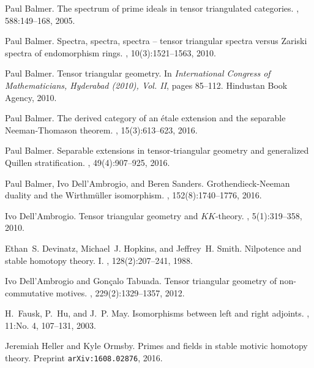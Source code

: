 \documentclass{amsart}
\numberwithin{equation}{section}
\theoremstyle{remark}
\begin{document}
\begin{thebibliography}{FHM03}

Paul Balmer.
\newblock The spectrum of prime ideals in tensor triangulated categories.
, 588:149--168, 2005.

Paul Balmer.
\newblock Spectra, spectra, spectra -- tensor triangular spectra versus
  {Z}ariski spectra of endomorphism rings.
, 10(3):1521--1563, 2010.

Paul Balmer.
\newblock Tensor triangular geometry.
\newblock In {\em International {C}ongress of {M}athematicians, Hyderabad
  (2010), {V}ol. {II}}, pages 85--112. Hindustan Book Agency, 2010.

Paul Balmer.
\newblock The derived category of an \'etale extension and the separable
  {N}eeman-{T}homason theorem.
, 15(3):613--623, 2016.

Paul Balmer.
\newblock Separable extensions in tensor-triangular geometry and generalized
  {Q}uillen stratification.
, 49(4):907--925, 2016.

Paul Balmer, Ivo Dell'Ambrogio, and Beren Sanders.
\newblock Grothendieck-{N}eeman duality and the {W}irthm\"uller isomorphism.
, 152(8):1740--1776, 2016.

Ivo Dell'Ambrogio.
\newblock Tensor triangular geometry and {$KK$}-theory.
, 5(1):319--358, 2010.

Ethan~S. Devinatz, Michael~J. Hopkins, and Jeffrey~H. Smith.
\newblock Nilpotence and stable homotopy theory. {I}.
, 128(2):207--241, 1988.

Ivo Dell'Ambrogio and Gon{\c{c}}alo Tabuada.
\newblock Tensor triangular geometry of non-commutative motives.
, 229(2):1329--1357, 2012.

H.~Fausk, P.~Hu, and J.~P. May.
\newblock Isomorphisms between left and right adjoints.
, 11:No. 4, 107--131, 2003.

Jeremiah Heller and Kyle Ormsby.
\newblock Primes and fields in stable motivic homotopy theory.
\newblock Preprint \texttt{arXiv:1608.02876}, 2016.


\end{thebibliography}
\end{document}
